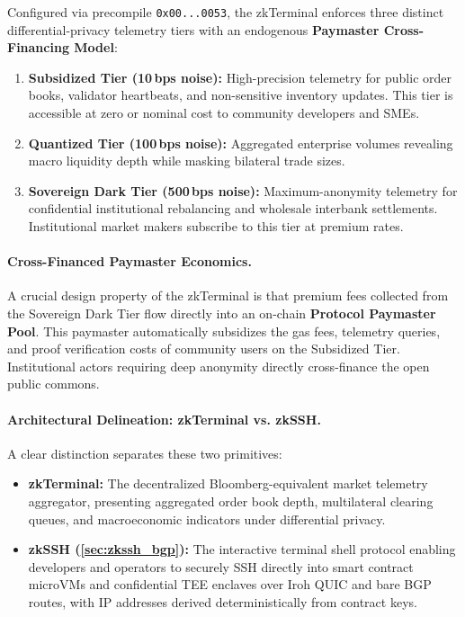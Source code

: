 \documentclass[a4paper,11pt,twoside,parskip=half-,headings=small]{scrartcl}
\newcommand{\code}[1]{\texttt{#1}}
\begin{document}
Configured via precompile \code{0x00...0053}, the zkTerminal enforces three distinct
differential-privacy telemetry tiers with an endogenous \textbf{Paymaster Cross-Financing Model}:
\begin{enumerate}
  \item \textbf{Subsidized Tier (10\,bps noise):} High-precision telemetry for public order
books, validator heartbeats, and non-sensitive inventory updates. This tier is accessible
at zero or nominal cost to community developers and SMEs.
  \item \textbf{Quantized Tier (100\,bps noise):} Aggregated enterprise volumes revealing
macro liquidity depth while masking bilateral trade sizes.
  \item \textbf{Sovereign Dark Tier (500\,bps noise):} Maximum-anonymity telemetry for
confidential institutional rebalancing and wholesale interbank settlements. Institutional
market makers subscribe to this tier at premium rates.
\end{enumerate}

\paragraph{Cross-Financed Paymaster Economics.}
A crucial design property of the zkTerminal is that premium fees collected from the Sovereign Dark
Tier flow directly into an on-chain \textbf{Protocol Paymaster Pool}. This paymaster automatically
subsidizes the gas fees, telemetry queries, and proof verification costs of community users on the Subsidized Tier.
Institutional actors requiring deep anonymity directly cross-finance the open public commons.

\paragraph{Architectural Delineation: zkTerminal vs. zkSSH.}
A clear distinction separates these two primitives:
\begin{itemize}
  \item \textbf{zkTerminal:} The decentralized Bloomberg-equivalent market telemetry aggregator, presenting aggregated order book depth, multilateral clearing queues, and macroeconomic indicators under differential privacy.
  \item \textbf{zkSSH (\cref{sec:zkssh_bgp}):} The interactive terminal shell protocol enabling developers and operators to securely SSH directly into smart contract microVMs and confidential TEE enclaves over Iroh QUIC and bare BGP routes, with IP addresses derived deterministically from contract keys.
\end{itemize}
\end{document}
